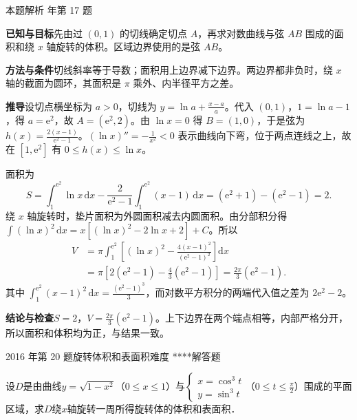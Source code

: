 \documentclass[UTF8,zihao=-4,fontset=fandol]{ctexart}
\newcounter{BankQuestion}
\newcommand{\QuestionPage}[7]{%
  \stepcounter{BankQuestion}%
  \par\noindent\begin{minipage}{\linewidth}
  \raggedright
  {\small\textcolor{black!60}{#3\quad #5\quad 难度 #7}\hfill\textcolor{accent}{#2}}\par\smallskip}
\newcommand{\QuestionEnd}{\end{minipage}\par\medskip}
\newcommand{\QuestionPage}[7]{%
  \clearpage
  \stepcounter{BankQuestion}%
  {\small\textcolor{accent}{#1\hfill #2}}\par\medskip
  {\small\textcolor{black!60}{#3\quad #5\quad 难度 #7\hfill \arabic{BankQuestion} / 234}}\par\vspace{9bp}}
\newcommand{\QuestionEnd}{}
\newenvironment{QuestionSolution}[1]{%
  \clearpage
  {\small\textcolor{black!60}{本题解析\quad #1}}\par\medskip
}{\par\clearpage}
\begin{document}
\begin{QuestionSolution}{2012 年第 17 题}
\textbf{已知与目标}\quad 先由过 \((0,1)\) 的切线确定切点 \(A\)，再求对数曲线与弦 \(AB\) 围成的面积和绕 \(x\) 轴旋转的体积。区域边界使用的是弦 \(AB\)。

\textbf{方法与条件}\quad 切线斜率等于导数；面积用上边界减下边界。两边界都非负时，绕 \(x\) 轴的截面为圆环，其面积是 \(\pi\) 乘外、内半径平方之差。

\textbf{推导}\quad 设切点横坐标为 \(a>0\)，切线为 \(y=\ln a+\frac{x-a}{a}\)。代入 \((0,1)\)，\(1=\ln a-1\)，得 \(a=\mathrm{e}^2\)，故 \(A=(\mathrm{e}^2,2)\)。由 \(\ln x=0\) 得 \(B=(1,0)\)，于是弦为 \(h(x)=\frac{2(x-1)}{\mathrm{e}^2-1}\)。\((\ln x)''=-\frac{1}{x^2}<0\) 表示曲线向下弯，位于两点连线之上，故在 \([1,\mathrm{e}^2]\) 有 \(0\le h(x)\le\ln x\)。

面积为
\[
S=\int_1^{\mathrm{e}^2}\ln x\,\mathrm{d}x
-\frac2{\mathrm{e}^2-1}\int_1^{\mathrm{e}^2}(x-1)\,\mathrm{d}x
=(\mathrm{e}^2+1)-(\mathrm{e}^2-1)=\boxed{2}.
\]
绕 \(x\) 轴旋转时，垫片面积为外圆面积减去内圆面积。由分部积分得 \(\int (\ln x)^2\,\mathrm{d}x=x[(\ln x)^2-2\ln x+2]+C\)。所以
\[
\begin{aligned}
V&=\pi\int_1^{\mathrm{e}^2}\left[(\ln x)^2-\frac{4(x-1)^2}{(\mathrm{e}^2-1)^2}\right]\mathrm{d}x\\
&=\pi\left[2(\mathrm{e}^2-1)-\frac43(\mathrm{e}^2-1)\right]
=\boxed{\frac{2\pi}{3}(\mathrm{e}^2-1)}.
\end{aligned}
\]
其中 \(\int_1^{\mathrm{e}^2}(x-1)^2\,\mathrm{d}x=\frac{(\mathrm{e}^2-1)^3}{3}\)，而对数平方积分的两端代入值之差为 \(2\mathrm{e}^2-2\)。

\textbf{结论与检查}\quad \(\boxed{S=2}\)，\(\boxed{V=\frac{2\pi}{3}(\mathrm{e}^2-1)}\)。上下边界在两个端点相等，内部严格分开，所以面积和体积均为正，与结果一致。
\end{QuestionSolution}

\QuestionPage{3.4 定积分的应用}{解答题}{2016 年第 20 题}{3}{旋转体积和表面积}{182 / 234}{****}
设$D$是由曲线$y = \sqrt{1 - x^2}$（$0 \le x \le 1$）与$\begin{cases}
  x = \cos^3 t \\
  y = \sin^3 t
\end{cases}$（$0 \le t \le \frac{\pi}{2}$）围成的平面区域，求$D$绕$x$轴旋转一周所得旋转体的体积和表面积．
\QuestionEnd
\end{document}
